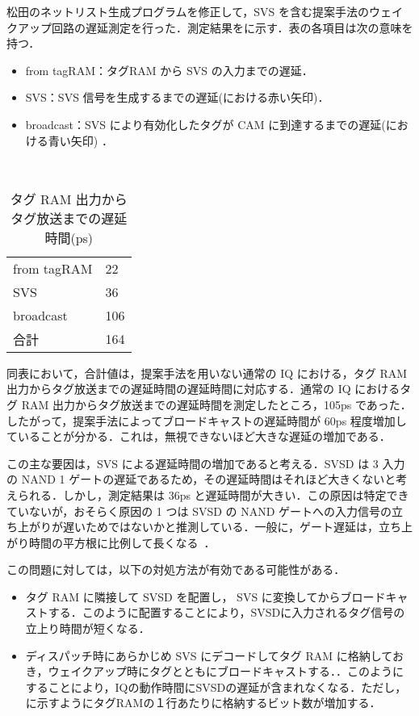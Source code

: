 松田のネットリスト生成プログラムを修正して，SVS を含む提案手法のウェイクアップ回路の遅延測定を行った．測定結果をに示す．表の各項目は次の意味を持つ．
  \begin{itemize}
    \item from tagRAM：タグRAM から SVS  の入力までの遅延．
    \item SVS：SVS 信号を生成するまでの遅延(における赤い矢印)．
    \item broadcast：SVS により有効化したタグが CAM に到達するまでの遅延(における青い矢印) ．
  \end{itemize}
　
  \begin{table}[htb]
    \caption{タグ RAM 出力からタグ放送までの遅延時間(ps)}
    \footnotesize
    \center
      \begin{tabular}{l|l} \hline \hline
       from tagRAM & 22 \\
       SVS & 36 \\
       broadcast & 106 \\ \hline
      合計 & 164 \\ \hline
    \end{tabular}
    \label{tab:delay}
  \end{table}

 同表において，合計値は，提案手法を用いない通常の IQ における，タグ RAM 出力からタグ放送までの遅延時間の遅延時間に対応する．通常の IQ におけるタグ RAM 出力からタグ放送までの遅延時間を測定したところ，105ps であった．したがって，提案手法によってブロードキャストの遅延時間が 60ps 程度増加していることが分かる．これは，無視できないほど大きな遅延の増加である．
  
  この主な要因は，SVS による遅延時間の増加であると考える．SVSD は 3 入力の NAND 1 ゲートの遅延であるため，その遅延時間はそれほど大きくないと考えられる．しかし，測定結果は 36ps と遅延時間が大きい．この原因は特定できていないが，おそらく原因の 1 つは SVSD の NAND ゲートへの入力信号の立ち上がりが遅いためではないかと推測している．一般に，ゲート遅延は，立ち上がり時間の平方根に比例して長くなる~\cite{Mark1983}．

  この問題に対しては，以下の対処方法が有効である可能性がある．
  \begin{itemize}
  \item タグ RAM に隣接して SVSD を配置し， SVS に変換してからブロードキャストする．このように配置することにより，SVSDに入力されるタグ信号の立上り時間が短くなる．
  \item ディスパッチ時にあらかじめ SVS にデコードしてタグ RAM に格納しておき，ウェイクアップ時にタグとともにブロードキャストする．．このようにすることにより，IQの動作時間にSVSDの遅延が含まれなくなる．ただし，に示すようにタグRAMの１行あたりに格納するビット数が増加する．
  \end{itemize}
    
